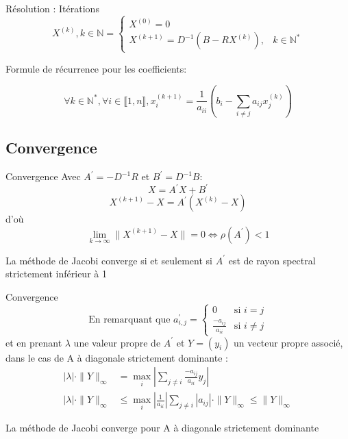 \documentclass{beamer}
\begin{document}
\begin{frame}{Résolution : Itérations}
\[
    X^{(k)}, k \in \mathds{N} =
\left\{
    \begin{array}{lr}
        X^{(0)} = 0 \\
        X^{(k+1)} = D^{-1} (B-RX^{(k)}),& k \in \mathds{N}^*
    \end{array}
\right.
\]

Formule de récurrence pour les coefficients:

\begin{equation} \label{eq:rec}
    \forall k \in \mathds{N}^*, \forall i \in \llbracket 1,n \rrbracket,
    x^{(k+1)}_i = \frac{1}{a_{ii}} (b_i - \sum_{i \neq j} a_{ij}x^{(k)}_j)
\end{equation}

\end{frame}

\subsection{Convergence}

\begin{frame}{Convergence}
    Avec \( A^\prime = -D^{-1}R\) et \( B^\prime = D^{-1}B \):
\[
    X = A^\prime X + B^\prime
\]
\[
    X^{(k+1)} - X =  A^\prime (X^{(k)} - X)
\]
d'où
\[
    \lim_{k \to \infty} \| X^{(k+1)} - X \| = 0 \Leftrightarrow \rho(A^\prime) < 1
\]
\begin{framed}
La méthode de Jacobi converge si et seulement si \(A^\prime\) est de rayon spectral strictement inférieur à 1
\end{framed}
\end{frame}

\begin{frame}{Convergence}
\[
\text{En remarquant que } a^\prime_{i,j} = \left\{
        \begin{array}{lr}
            0 & \text{si } i = j \\
            \frac{-a_{ij}}{a_{ii}} & \text{si } i \neq j
        \end{array}
    \right.
\]
et en prenant \( \lambda \) une valeur propre de \( A^\prime \) et \( Y = (y_i) \)
un vecteur propre associé, dans le cas de A à diagonale strictement dominante :
\begin{align*}
    |\lambda| \cdot\| Y\|_\infty &= \max_{i} | \sum_{j \neq i} \frac{-a_{ij}}{a_{ii}} y_j | \\
    |\lambda| \cdot\| Y\|_\infty &\leq \max_{i}|\frac{1}{a_{ii}}| \sum_{j \neq i} |a_{ij}| \cdot\| Y\|_\infty \leq \| Y\|_\infty
\end{align*}
\begin{framed}
La méthode de Jacobi converge pour A à diagonale strictement dominante
\end{framed}
\end{frame}
\end{document}
